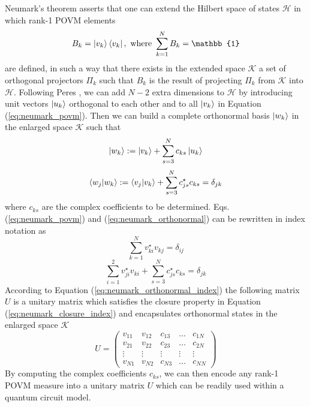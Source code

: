 Neumark's theorem \cite{neumark1940} asserts that one can extend the Hilbert space of states $\mathcal{H}$ in which rank-1 POVM elements 
\begin{equation}\label{eq:neumark_povm}
B_k = \ket{v_{k}} \bra{v_{k}},\ \text{where}\ \sum_{k=1}^{N} B_{k} = \mathbb{1}
\end{equation}
 are defined, in such a way that there exists in the extended space $\mathcal{K}$ a set of orthogonal projectors $\Pi_{k}$ such that $B_k$
 is the result of projecting $\Pi_{k}$ from $\mathcal{K}$ into $\mathcal{H}$. Following Peres \cite{peres1995}, we can add $N-2$ extra dimensions to $\mathcal{H}$ by introducing unit vectors $\ket{u_{k}}$ orthogonal to each other and to all $\ket{v_{k}}$ in Equation (\ref{eq:neumark_povm}). Then we can build a complete orthonormal basis $\ket{w_{k}}$ in the enlarged space $\mathcal{K}$ such that
\begin{equation}
\ket{w_{k}} := \ket{v_{k}} + \sum_{s=3}^{N} c_{k s} \ket{u_{k}}
\end{equation}
\begin{equation}\label{eq:neumark_orthonormal}
\bra{w_{j}} \ket{w_{k}} := \bra{v_{j}} \ket{v_{k}} + \sum_{s=3}^{N} c_{j s}^{\star} c_{k s} = \delta_{j k}
\end{equation}
where $c_{ks}$ are the complex coefficients to be determined. Eqs. (\ref{eq:neumark_povm}) and (\ref{eq:neumark_orthonormal}) can be rewritten in index notation as 
\begin{equation}\label{eq:neumark_closure_index}
\sum_{k=1}^{N}v_{k i}^{\star} v_{k j} = \delta_{ij}
\end{equation}
\begin{equation}\label{eq:neumark_orthonormal_index}
\sum_{i=1}^{2} v_{j i}^{\star} v_{k i} + \sum_{s=3}^{N} c_{j s}^{\star} c_{k s} = \delta_{j k}
\end{equation}
According to Equation (\ref{eq:neumark_orthonormal_index}) the following matrix $U$ is a unitary matrix which satisfies the closure property in Equation (\ref{eq:neumark_closure_index}) and encapsulates orthonormal states in the enlarged space $\mathcal{K}$ 
\begin{equation}
U = 
\begin{pmatrix}
v_{1 1} & v_{1 2} & c_{13} & \dots & c_{1 N} \\
v_{2 1} & v_{2 2} & c_{23} & \dots & c_{2 N} \\
\vdots & \vdots & \vdots & \vdots &  \vdots \\
v_{N1} & v_{N2} & c_{N3} & \dots & c_{NN}
\end{pmatrix}
\end{equation}
By computing the complex coefficients $c_{ks}$, we can then encode any rank-1 POVM measure into a unitary matrix $U$ which can be readily used within a quantum circuit model.